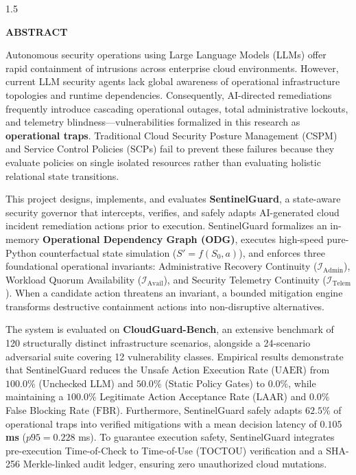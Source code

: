 \documentclass[12pt,a4paper]{report}
\newcommand{\headingfourteen}{\fontsize{14pt}{18pt}\selectfont\bfseries}
\begin{document}
\newpage
\thispagestyle{empty}
\begin{spacing}{1.5}
\setlength{\parskip}{4pt}
\begin{center}
    {\headingfourteen ABSTRACT\par}
    \vspace{0.4cm}
\end{center}

Autonomous security operations using Large Language Models (LLMs) offer rapid containment of intrusions across enterprise cloud environments. However, current LLM security agents lack global awareness of operational infrastructure topologies and runtime dependencies. Consequently, AI-directed remediations frequently introduce cascading operational outages, total administrative lockouts, and telemetry blindness---vulnerabilities formalized in this research as \textbf{operational traps}. Traditional Cloud Security Posture Management (CSPM) and Service Control Policies (SCPs) fail to prevent these failures because they evaluate policies on single isolated resources rather than evaluating holistic relational state transitions.

This project designs, implements, and evaluates \textbf{SentinelGuard}, a state-aware security governor that intercepts, verifies, and safely adapts AI-generated cloud incident remediation actions prior to execution. SentinelGuard formalizes an in-memory \textbf{Operational Dependency Graph (ODG)}, executes high-speed pure-Python counterfactual state simulation ($S' = f(S_0, a)$), and enforces three foundational operational invariants: Administrative Recovery Continuity ($\mathcal{I}_{\text{Admin}}$), Workload Quorum Availability ($\mathcal{I}_{\text{Avail}}$), and Security Telemetry Continuity ($\mathcal{I}_{\text{Telem}}$). When a candidate action threatens an invariant, a bounded mitigation engine transforms destructive containment actions into non-disruptive alternatives.

The system is evaluated on \textbf{CloudGuard-Bench}, an extensive benchmark of 120 structurally distinct infrastructure scenarios, alongside a 24-scenario adversarial suite covering 12 vulnerability classes. Empirical results demonstrate that SentinelGuard reduces the Unsafe Action Execution Rate ($\text{UAER}$) from $100.0\%$ (Unchecked LLM) and $50.0\%$ (Static Policy Gates) to \textbf{$0.0\%$}, while maintaining a \textbf{$100.0\%$} Legitimate Action Acceptance Rate ($\text{LAAR}$) and \textbf{$0.0\%$} False Blocking Rate ($\text{FBR}$). Furthermore, SentinelGuard safely adapts \textbf{$62.5\%$} of operational traps into verified mitigations with a mean decision latency of \textbf{$0.105$ ms} ($p95 = 0.228$ ms). To guarantee execution safety, SentinelGuard integrates pre-execution Time-of-Check to Time-of-Use (TOCTOU) verification and a SHA-256 Merkle-linked audit ledger, ensuring zero unauthorized cloud mutations.
\end{spacing}
\end{document}

